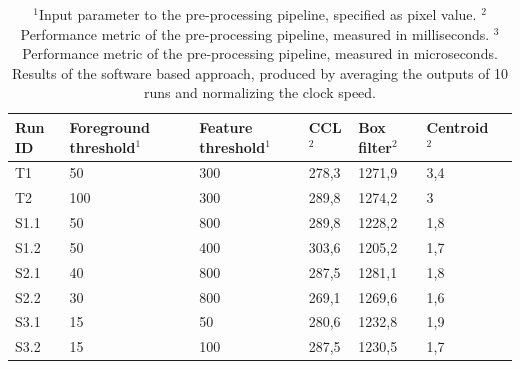 \documentclass[12pt]{report}
\begin{document}
\begin{table}[!h]
    \centering
    \begin{tabular}{|p{0.8cm}|p{2.5cm}|p{2cm}||p{1.25cm}|p{1.25cm}|p{1.9cm}|p{1cm}|}
        \hline
        \textbf{Run ID}&\textbf{Foreground threshold$^{1}$}&\textbf{Feature threshold$^{1}$}&\textbf{CCL$^{2}$}&\textbf{Box filter$^{2}$}&\textbf{Centroid$^{2}$}\\
        \hline
        T1&50&300&278,3&1271,9&3,4\\
        \hline
        T2&100&300&289,8&1274,2&3\\
        \hline
        S1.1&50&800&289,8&1228,2&1,8\\
        \hline
        S1.2&50&400&303,6&1205,2&1,7\\
        \hline
        S2.1&40&800&287,5&1281,1&1,8\\
        \hline
        S2.2&30&800&269,1&1269,6&1,6\\
        \hline
        S3.1&15&50&280,6&1232,8&1,9\\
        \hline
        S3.2&15&100&287,5&1230,5&1,7\\
        \hline
    \end{tabular}
    \caption{$^{1}$Input parameter to the pre-processing pipeline, specified as pixel value. $^{2}$Performance metric of the pre-processing pipeline, measured in milliseconds. $^{3}$Performance metric of the pre-processing pipeline, measured in microseconds. \newline Results of the software based approach, produced by averaging the outputs of 10 runs and normalizing the clock speed.}
    \label{table:res_sw_norm}
\end{table}


\end{document}

